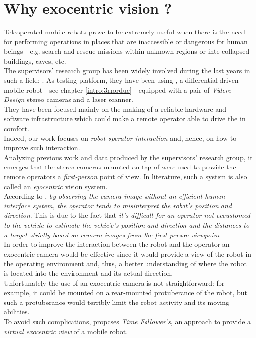 \section{Why exocentric vision ?}
\label{exo:why_exocentric}

Teleoperated mobile robots prove to be extremely useful 
when there is the need for performing operations in places that 
are inaccessible or dangerous for human beings - e.g. 
search-and-rescue missions within unknown regions or into 
collapsed buildings, caves, etc.
\\
The supervisors' research group has been widely involved 
during the last years in such a field: \cite{livatino2010}.
As testing platform, they have been using \morduc{},
a differential-driven mobile robot - see chapter \ref{intro:3morduc} -
equipped with a pair of \textit{Videre Design} \cite{videredesign} 
stereo cameras and a laser scanner.
\\
They have been focused 
mainly on the making of a reliable hardware and software 
infrastructure which could make a remote operator able to drive 
the \morduc{} in comfort.
\\
Indeed, our work focuses on \textit{robot-operator interaction} and, 
hence, on how to improve such interaction. 
\\
Analyzing previous work and data produced by the supervisors' 
research group, it emerges that the stereo cameras mounted on 
top of \morduc{} were used to provide the remote operators a 
\textit{first-person} point of view. In literature, such a 
system is also called an \textit{egocentric} vision system.
\\
According to \cite{sugimoto}, \textit{by observing the camera image 
without an efficient human interface system, the operator 
tends to misinterpret the robot's position and direction}. This is 
due to the fact that \textit{it's difficult for an
operator not accustomed to the vehicle to estimate the
vehicle's position and direction and the distances to a
target strictly based on camera images from the first person 
viewpoint}.
\\
In order to improve the interaction between the robot and the operator 
an exocentric camera would be effective since it would provide a 
view of the robot in the operating environment and, thus, 
a better understanding of where the robot is located into the
environment and its actual direction.
\\
Unfortunately the use of an exocentric camera is not straightforward: 
for example, it could be mounted on a rear-mounted protuberance of the 
robot, but such a protuberance would terribly limit the robot activity and 
its moving abilities.
\\
To avoid such complications, \cite{sugimoto} proposes 
\textit{Time Follower's}, an approach to provide a \textit{virtual exocentric 
view} of a mobile robot.


